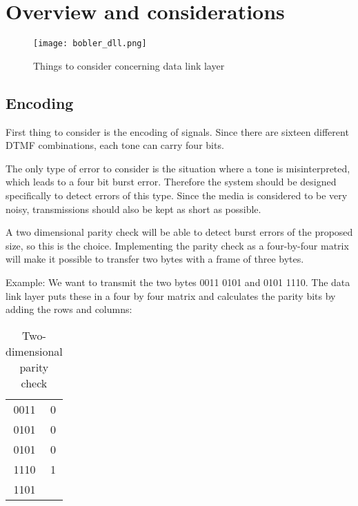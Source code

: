\section{Overview and considerations}%

\begin{figure}[htb]
	\begin{center}
	\texttt{[image: bobler\_dll.png]} %
	\caption{Things to consider concerning data link layer}
	\label{fig:bobler_dll}
	\end{center}
\end{figure}

\subsection{Encoding}
First thing to consider is the encoding of signals. Since there are sixteen
different DTMF combinations, each tone can carry four bits.

The only type of error to consider is the situation where a tone is
misinterpreted, which leads to a four bit burst error. Therefore the system
should be designed specifically to detect errors of this type. Since the media
is considered to be very noisy, transmissions should also be kept as short as
possible.

A two dimensional parity check will be able to detect burst errors of the
proposed size, so this is the choice. Implementing the parity check as a
four-by-four matrix will make it possible to transfer two bytes with a frame of
three bytes.

Example: We want to transmit the two bytes 0011 0101 and 0101 1110. The data
link layer puts these in a four by four matrix and calculates the parity bits by
adding the rows and columns:


\begin{table}[htb]
	\begin{center}
	\begin{tabular}{c|c}
	0011 & 0 \\
	0101 & 0 \\
	0101 & 0 \\
	1110 & 1 \\
	\hline
	1101 & \\
	\end{tabular}
	\end{center}
	\caption{Two-dimensional parity check}
	\label{tab:Two_dimensional_parity_check}
\end{table}


